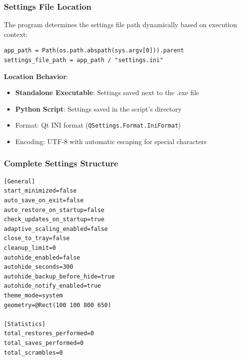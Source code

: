\documentclass[a4paper,11pt]{article}
\begin{document}
\subsubsection{Settings File Location}

The program determines the settings file path dynamically based on
execution context:

\begin{verbatim}
app_path = Path(os.path.abspath(sys.argv[0])).parent
settings_file_path = app_path / "settings.ini"
\end{verbatim}

\textbf{Location Behavior}:
\begin{itemize}
  \item \textbf{Standalone Executable}: Settings saved next to the .exe file
  \item \textbf{Python Script}: Settings saved in the script's directory
  \item Format: Qt INI format (\texttt{QSettings.Format.IniFormat})
  \item Encoding: UTF-8 with automatic escaping for special characters
\end{itemize}

\subsubsection{Complete Settings Structure}

\begin{verbatim}
[General]
start_minimized=false
auto_save_on_exit=false
auto_restore_on_startup=false
check_updates_on_startup=true
adaptive_scaling_enabled=false
close_to_tray=false
cleanup_limit=0
autohide_enabled=false
autohide_seconds=300
autohide_backup_before_hide=true
autohide_notify_enabled=true
theme_mode=system
geometry=@Rect(100 100 800 650)

[Statistics]
total_restores_performed=0
total_saves_performed=0
total_scrambles=0
\end{verbatim}
\end{document}

